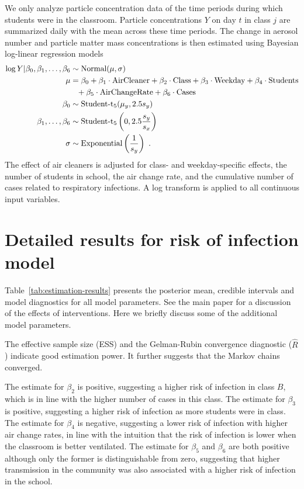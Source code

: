 \documentclass[fleqn,11pt]{wlscirep_supp}
\begin{document}
We only analyze particle concentration data of the time periods during which students were in the classroom. Particle concentrations $Y$ on day $t$ in class $j$ are summarized daily with the mean across these time periods. The change in aerosol number and particle matter mass concentrations is then estimated using Bayesian log-linear regression models
\begin{align*}
    \log Y | \beta_0, \beta_1, \dots, \beta_6 &\sim \text{Normal}(\mu,\sigma) \\
    \mu &= \beta_0 + \beta_1 \cdot \text{AirCleaner} + \beta_2 \cdot \text{Class} + \beta_3 \cdot \text{Weekday} + \beta_4 \cdot \text{Students} \\
    &\hphantom{= } + \beta_5 \cdot \text{AirChangeRate} + \beta_6 \cdot \text{Cases} \\
    \beta_0 &\sim \text{Student-t}_5(\mu_y, 2.5s_{y}) \\
    \beta_1, \dots, \beta_6 &\sim \text{Student-t}_5\left(0, 2.5\frac{s_{y}}{s_{x}}\right) \\
    \sigma &\sim \text{Exponential}\left(\frac{1}{s_{y}}\right)~.
\end{align*}
The effect of air cleaners is adjusted for class- and weekday-specific effects, the number of students in school, the air change rate, and the cumulative number of cases related to respiratory infections. A log transform is applied to all continuous input variables. 

\clearpage

\section{Detailed results for risk of infection model}\label{sec:detailed-redcap}

Table~\ref{tab:estimation-results} presents the posterior mean, credible intervals and model diagnostics for all model parameters. See the main paper for a discussion of the effects of interventions. Here we briefly discuss some of the additional model parameters.

The effective sample size (ESS) and the Gelman-Rubin convergence diagnostic ($\hat{R}$) indicate good estimation power. It further suggests that the Markov chains converged. 

The estimate for $\beta_2$ is positive, suggesting a higher risk of infection in class $B$, which is in line with the higher number of cases in this class. The estimate for $\beta_3$ is positive, suggesting a higher risk of infection as more students were in class. The estimate for $\beta_4$ is negative, suggesting a lower risk of infection with higher air change rates, in line with the intuition that the risk of infection is lower when the classroom is better ventilated. The estimate for $\beta_5$ and $\beta_6$ are both positive although only the former is distinguishable from zero, suggesting that higher transmission in the community was also associated with a higher risk of infection in the school. 
\end{document}

